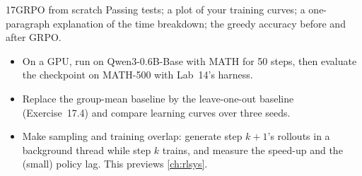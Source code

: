 \begin{labbox}{17}{GRPO from scratch}
Passing tests; a plot of your training curves; a one-paragraph explanation of the
time breakdown; the greedy accuracy before and after GRPO.

\begin{itemize}
\item On a GPU, run  on Qwen3-0.6B-Base with MATH for 50 steps, then
evaluate the checkpoint on MATH-500 with Lab~14's harness.
\item Replace the group-mean baseline by the leave-one-out baseline (Exercise~17.4) and
compare learning curves over three seeds.
\item Make sampling and training overlap: generate step $k{+}1$'s rollouts in a background
thread while step $k$ trains, and measure the speed-up and the (small) policy lag. This
previews \cref{ch:rlsys}.
\end{itemize}
\end{labbox}
